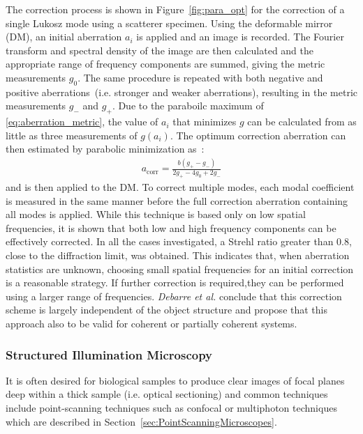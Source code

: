 The correction process is shown in Figure~\ref{fig:para_opt} for the correction of a single Lukosz mode using a scatterer specimen. Using the deformable mirror (DM), an initial aberration $a_i$ is applied and an image is recorded. The Fourier transform and spectral density of the image are then calculated and the appropriate range of frequency components are summed, giving the metric measurements $g_0$. The same procedure is repeated with both negative and positive aberrations~(i.e. stronger and weaker aberrations), resulting in the metric measurements $g_-$ and  $g_+$. Due to the paraboilc maximum of \eqref{eq:aberration_metric}, the value of $a_i$ that minimizes $g$ can be calculated from as little as three measurements of $g(a_i)$. The optimum correction aberration can then estimated by parabolic minimization as~\cite{wide_parabolic_optimization}:
\begin{align}
	a_\text{corr} = \frac{b(g_+ - g_-)}{2g_+ - 4g_0 + 2g_-}
\end{align}
and is then applied to the DM. To correct multiple modes, each modal coefficient is measured in the same manner before the full correction aberration containing all modes is applied. While this technique is based only on low spatial frequencies, it is shown that both low and high frequency components can be effectively corrected. In all the cases investigated, a Strehl ratio greater than 0.8, close to the diffraction limit, was obtained. This indicates that, when aberration statistics are unknown, choosing small spatial frequencies for an initial correction is a reasonable strategy. If further correction is required,they can be performed using a larger range of frequencies. \emph{Debarre et al.} conclude that this correction scheme is largely independent of the object structure and propose that this approach also to be valid for coherent or partially coherent systems.


\subsubsection{Structured Illumination Microscopy}
\label{sec:StructuredIlluminationMicroscopy}

It is often desired for biological samples to produce clear images of focal planes deep within a thick sample (i.e. optical sectioning) and common techniques include point-scanning techniques such as confocal or multiphoton techniques which are described in Section~\ref{sec:PointScanningMicroscopes}. 

